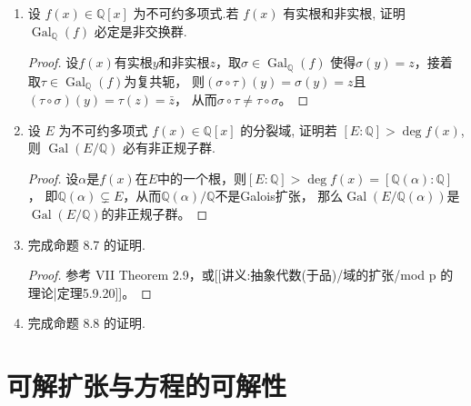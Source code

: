 \begin{enumerate}
\item 设 $ f(x) \in \mathbb{Q}[x] $ 为不可约多项式.若 $ f(x) $ 有实根和非实根,
证明 $ \operatorname{Gal}_{\mathbb{Q}}(f) $ 必定是非交换群.
\begin{proof}
    设$f(x)$有实根$y$和非实根$z$，取$\sigma\in\operatorname{Gal}_{\mathbb{Q}}(f)$
    使得$\sigma(y)=z$，接着取$\tau\in\operatorname{Gal}_{\mathbb{Q}}(f)$为复共轭，
    则$(\sigma\circ\tau)(y)=\sigma(y)=z$且$(\tau\circ\sigma)(y)=\tau(z)=\bar{z}$，
    从而$\sigma\circ\tau\ne\tau\circ\sigma$。
\end{proof}
\item 设 $ E $ 为不可约多项式 $ f(x) \in \mathbb{Q}[x] $ 的分裂域,
证明若 $ [E : \mathbb{Q}] > \deg f(x) $,
则 $ \operatorname{Gal}(E/\mathbb{Q}) $ 必有非正规子群.
\begin{proof}
    设$\alpha$是$f(x)$在$E$中的一个根，则$[E:\mathbb{Q}]>\deg f(x)=[\mathbb{Q}(\alpha):\mathbb{Q}]$，
    即$\mathbb{Q}(\alpha) \subsetneq E$，从而$\mathbb{Q}(\alpha)/\mathbb{Q}$不是Galois扩张，
    那么$\operatorname{Gal}(E/\mathbb{Q}(\alpha))$是$\operatorname{Gal}(E/\mathbb{Q})$的非正规子群。
\end{proof}
\item 完成命题 8.7 的证明.
\begin{proof}
    参考\cite{La} VII Theorem 2.9，或[[讲义:抽象代数(于品)/域的扩张/mod p 的理论|定理5.9.20]]。
\end{proof}
\item 完成命题 8.8 的证明.
\end{enumerate}

\section{可解扩张与方程的可解性}


